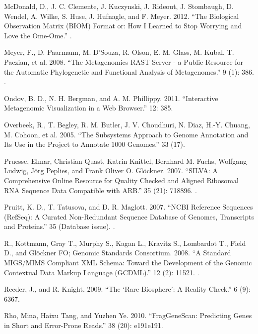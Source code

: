 \documentclass[letterpaper,10pt,english]{sphinxmanual}
\begin{document}
McDonald, D., J. C. Clemente, J. Kuczynski, J. Rideout, J.
Stombaugh, D. Wendel, A. Wilke, S. Huse, J. Hufnagle, and F.
Meyer. 2012. “The Biological Observation Matrix (BIOM) Format or:
How I Learned to Stop Worrying and Love the Ome-Ome.”
.

Meyer, F., D. Paarmann, M. D’Souza, R. Olson, E. M. Glass, M.
Kubal, T. Paczian, et al. 2008. “The Metagenomics RAST Server - a
Public Resource for the Automatic Phylogenetic and Functional
Analysis of Metagenomes.”  9 (1): 386.
.

Ondov, B. D., N. H. Bergman, and A. M. Phillippy. 2011.
“Interactive Metagenomic Visualization in a Web Browser.”  12: 385.

Overbeek, R., T. Begley, R. M. Butler, J. V. Choudhuri, N. Diaz,
H.-Y. Chuang, M. Cohoon, et al. 2005. “The Subsystems Approach to
Genome Annotation and Its Use in the Project to Annotate 1000
Genomes.”  33 (17).

Pruesse, Elmar, Christian Quast, Katrin Knittel, Bernhard M.
Fuchs, Wolfgang Ludwig, Jörg Peplies, and Frank Oliver O.
Glöckner. 2007. “SILVA: A Comprehensive Online Resource for
Quality Checked and Aligned Ribosomal RNA Sequence Data Compatible
with ARB.”  35 (21): 7188\textendash{}96.
.

Pruitt, K. D., T. Tatusova, and D. R. Maglott. 2007. “NCBI
Reference Sequences (RefSeq): A Curated Non-Redundant Sequence
Database of Genomes, Transcripts and Proteins.”  35 (Database issue).
.

R., Kottmann, Gray T., Murphy S., Kagan L., Kravitz S., Lombardot
T., Field D., and Glöckner FO; Genomic Standards Consortium. 2008.
“A Standard MIGS/MIMS Compliant XML Schema: Toward the Development
of the Genomic Contextual Data Markup Language (GCDML).” 
12 (2): 115\textendash{}21. .

Reeder, J., and R. Knight. 2009. “The ‘Rare Biosphere’: A Reality
Check.”  6 (9): 636\textendash{}7.

Rho, Mina, Haixu Tang, and Yuzhen Ye. 2010. “FragGeneScan:
Predicting Genes in Short and Error-Prone Reads.”  38 (20): e191\textendash{}e191.
\end{document}
